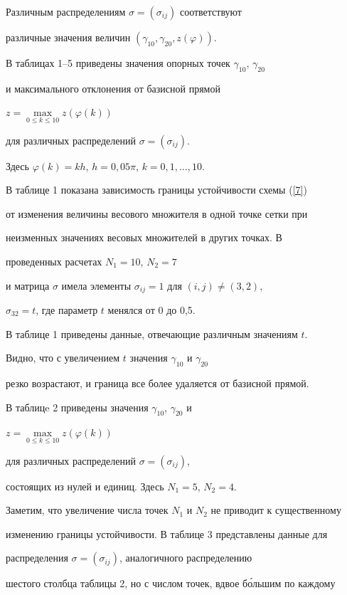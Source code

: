 Различным распределениям $\sigma = ( \sigma_{ij})$ соответствуют


различные значения величин $(\gamma_{10}, \gamma_{20}, z(\varphi))$.


В таблицах 1--5 приведены значения опорных точек $\gamma_{10}$, $\gamma_{20}$


и максимального отклонения от базисной прямой


$z = \max\limits_{0\le k\le 10} z( \varphi(k))$


для различных распределений $\sigma =(\sigma_{ij})$.


Здесь $\varphi(k) = kh$, $h = 0,05 \pi$, $k = 0,1,\dotsc,10$.





В таблице 1 показана зависимость границы устойчивости схемы (\ref{7})


от изменения величины весового множителя в одной точке сетки при


неизменных значениях весовых множителей в других точках. В 


проведенных расчетах $N_1=10$, $N_2=7$


и матрица $\sigma$ имела элементы $\sigma_{ij}=1$ для $(i,j) \ne (3,2)$,


$\sigma_{32}=t$, где параметр $t$ менялся от 0 до 0,5.


В таблице 1 приведены данные, отвечающие различным значениям $t$.


Видно, что с увеличением $t$ значения $\gamma_{10}$ и $\gamma_{20}$


резко возрастают, и граница все более удаляется от базисной прямой.





В таблицe 2 приведены значения $\gamma_{10}$, $\gamma_{20}$ и


$z = \max\limits_{0\le k\le 10} z( \varphi(k))$


для различных распределений $\sigma = ( \sigma_{ij})$,


состоящих из нулей и единиц. Здесь $N_1=5$, $N_2=4$.


Заметим, что увеличение числа точек $N_1$ и $N_2$ не приводит к существенному


изменению границы устойчивости. В таблице 3 представлены данные для


распределения $\sigma =(\sigma_{ij})$, аналогичного распределению


шестого столбца таблицы 2, но с числом точек, вдвое б\'ольшим по каждому


